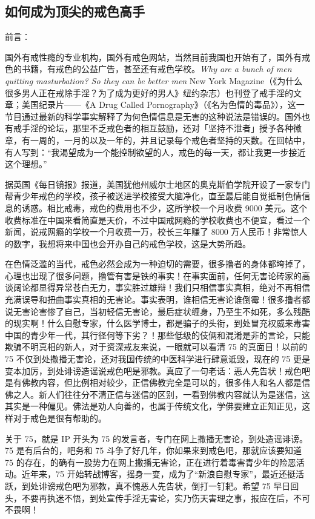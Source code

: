 \documentclass{ctexart}
\begin{document}
\subsection{如何成为顶尖的戒色高手}

前言：

国外有戒性瘾的专业机构，国外有戒色网站，当然目前我国也开始有了，国外有戒色的书籍，有戒色的公益广告，甚至还有戒色学校。\textit{Why are a bunch of men quitting masturbation? So they can be better men} New York Magazine（《为什么很多男人正在戒除手淫？为了成为更好的男人》纽约杂志）也刊登了戒手淫的文章；美国纪录片——《A Drug Called Pornography》（《名为色情的毒品》），这一节目通过最新的科学事实解释了为何色情信息是无害的这种说法是错误的。国外也有戒手淫的论坛，那里不乏戒色者的相互鼓励，还对「坚持不泄者」授予各种徽章，有一周的，一月的以及一年的，并且记录每个戒色者坚持的天数。在回帖中，有人写到：“我渴望成为一个能控制欲望的人，戒色的每一天，都让我更一步接近这个理想。”

据英国《每日镜报》报道，美国犹他州威尔士地区的奥克斯伯学院开设了一家专门帮青少年戒色的学校，孩子被送进学校接受大脑净化，直至最后能自觉抵制色情信息的诱惑。相比戒毒，戒色的费用也不少，这所学校一个月收费 9000 美元。这个收费标准在中国来看简直是天价，不过中国戒网瘾的学校收费也不便宜，看过一个新闻，说戒网瘾的学校一个月收费一万，校长三年赚了 8000 万人民币！非常惊人的数字，我想将来中国也会开办自己的戒色学校，这是大势所趋。

在色情泛滥的当代，戒色必然会成为一种迫切的需要，很多撸者的身体都垮掉了，心理也出现了很多问题，撸管有害是铁的事实！在事实面前，任何无害论砖家的高谈阔论都显得异常苍白无力，事实胜过雄辩！我们只相信事实真相，绝对不再相信充满误导和扭曲事实真相的无害论。事实表明，谁相信无害论谁倒霉！很多撸者都说无害论害惨了自己，当初轻信无害论，最后症状缠身，乃至生不如死，多么残酷的现实啊！什么自慰专家，什么医学博士，都是骗子的头衔，到处冒充权威来毒害中国的青少年一代，其行径何等下劣？！那些低级的伎俩和混淆是非的言论，只能欺骗不明真相的新人，对于资深戒友来说，一眼就可以看清 75 的真面目！以前的 75 不仅到处撒播无害论，还对我国传统的中医科学进行肆意诋毁，现在的 75 更是变本加厉，到处诽谤造谣说戒色吧是邪教。真应了一句老话：恶人先告状！戒色吧是有佛教内容，但比例相对较少，正信佛教完全是可以的，很多伟人和名人都是信佛之人。新人们往往分不清正信与迷信的区别，一看到佛教内容就认为是迷信，这其实是一种偏见。佛法是劝人向善的，也属于传统文化，学佛要建立正知正见，这样对于戒色是很有帮助的。

关于 75，就是 IP 开头为 75 的发言者，专门在网上撒播无害论，到处造谣诽谤。75 是有后台的，吧务和 75 斗争了好几年，你如果来到戒色吧，那就应该要知道 75 的存在，的确有一股势力在网上撒播无害论，正在进行着毒害青少年的险恶活动。近年来，75 开始转战博客，摇身一变，成为了“新浪自慰专家”，最近还挺活跃，到处诽谤戒色吧为邪教，真不愧恶人先告状，倒打一钉耙。希望 75 早日回头，不要再执迷不悟，到处宣传手淫无害论，实乃伤天害理之事，报应在后，不可不畏啊！
\end{document}
